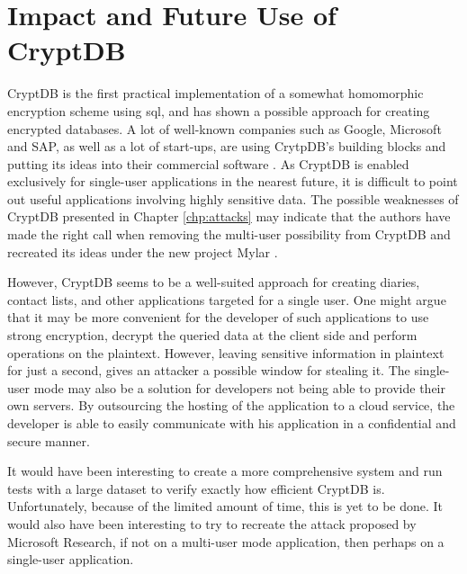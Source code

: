 \section{Impact and Future Use of CryptDB}

CryptDB is the first practical implementation of a somewhat homomorphic encryption scheme using \gls{sql}, and has shown a possible approach for creating encrypted databases. A lot of well-known companies such as Google, Microsoft and SAP, as well as a lot of start-ups, are using CrytpDB's building blocks and putting its ideas into their commercial software \cite{cryptdb_homepage}. As CryptDB is enabled exclusively for single-user applications in the nearest future, it is difficult to point out useful applications involving highly sensitive data. The possible weaknesses of CryptDB presented in Chapter \ref{chp:attacks} may indicate that the authors have made the right call when removing the multi-user possibility from CryptDB and recreated its ideas under the new project Mylar \cite{mylar_homepage}.  

However, CryptDB seems to be a well-suited approach for creating diaries, contact lists, and other applications targeted for a single user. One might argue that it may be more convenient for the developer of such applications to use strong encryption, decrypt the queried data at the client side and perform operations on the plaintext. However, leaving sensitive information in plaintext for just a second, gives an attacker a possible window for stealing it. The single-user mode may also be a solution for developers not being able to provide their own servers. By outsourcing the hosting of the application to a cloud service, the developer is able to easily communicate with his application in a confidential and secure manner.

It would have been interesting to create a more comprehensive system and run tests with a large dataset to verify exactly how efficient CryptDB is. Unfortunately, because of the limited amount of time, this is yet to be done. It would also have been interesting to try to recreate the attack proposed by Microsoft Research, if not on a multi-user mode application, then perhaps on a single-user application.


